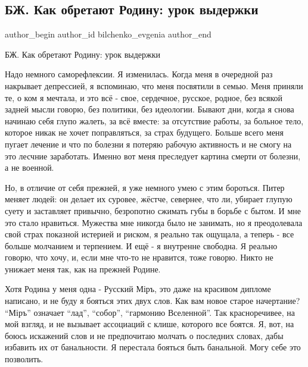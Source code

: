  
 
 
 
 
\subsection{БЖ. Как обретают Родину: урок выдержки}
\label{sec:18_01_2022.tg.bilchenko_evgenia.1.rodina}

\ifcmt
 author_begin
   author_id bilchenko_evgenia
 author_end
\fi

БЖ. Как обретают Родину: урок выдержки

Надо немного саморефлексии. Я изменилась. Когда меня в очередной раз накрывает
депрессией, я вспоминаю, что меня посвятили в семью. Меня приняли те, о ком я
мечтала, и это всё - свое, сердечное, русское, родное, без всякой задней мысли
говорю, без политики, без идеологии.  Бывают дни, когда я снова начинаю себя
глупо жалеть, за всё вместе: за отсутствие работы, за больное тело, которое
никак не хочет поправляться, за страх будущего. Больше всего меня пугает
лечение и что по болезни я потеряю рабочую активность и не смогу на это лесчние
заработать. Именно вот меня преследует картина смерти от болезни, а не военной.


Но, в отличие от себя прежней, я уже немного умею с этим бороться. Питер меняет
людей: он делает их суровее, жёстче, севернее, что ли, убирает глупую суету и
заставляет привычно, безропотно сжимать губы в борьбе с бытом. И мне это стало
нравиться. Мужества мне никогда было не занимать, но я преодолевала свой страх
показной истерией и риском, я реально так ощущала, а теперь - все больше
молчанием и терпением. И ещё - я внутренне свободна. Я реально говорю, что
хочу, и, если мне что-то не нравится, тоже говорю. Никто не унижает меня так,
как на прежней Родине. 

Хотя Родина у меня одна - Русский Міръ, это даже на красивом дипломе написано,
и не буду я бояться этих двух слов. Как вам новое старое начертание?
\enquote{Міръ} означает \enquote{лад}, \enquote{собор}, \enquote{гармонию
Вселенной}. Так красноречивее, на мой взгляд, и не вызывает ассоциаций с клише,
которого все боятся. Я, вот, на боюсь искажений слов и не предпочитаю молчать о
последних словах, дабы избавить их от банальности. Я перестала бояться быть
банальной. Могу себе это позволить.

